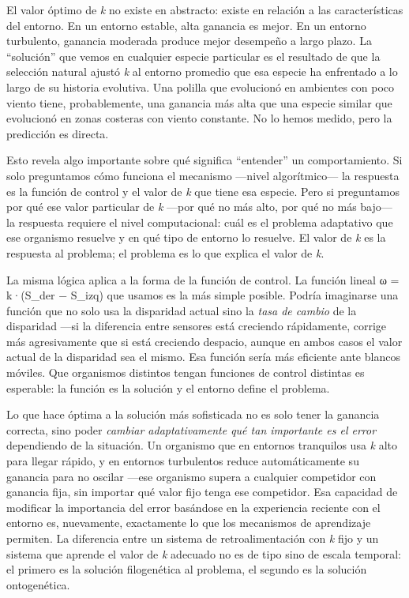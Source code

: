 \documentclass[
  letterpaper,
  DIV=11,
  numbers=noendperiod]{scrreprt}
\begin{document}
\begin{tcolorbox}[enhanced jigsaw, toprule=.15mm, arc=.35mm, colback=white, opacityback=0, colframe=quarto-callout-note-color-frame, breakable, rightrule=.15mm, left=2mm, leftrule=.75mm, bottomrule=.15mm]
El valor óptimo de \emph{k} no existe en abstracto: existe en relación a
las características del entorno. En un entorno estable, alta ganancia es
mejor. En un entorno turbulento, ganancia moderada produce mejor
desempeño a largo plazo. La ``solución'' que vemos en cualquier especie
particular es el resultado de que la selección natural ajustó \emph{k}
al entorno promedio que esa especie ha enfrentado a lo largo de su
historia evolutiva. Una polilla que evolucionó en ambientes con poco
viento tiene, probablemente, una ganancia más alta que una especie
similar que evolucionó en zonas costeras con viento constante. No lo
hemos medido, pero la predicción es directa.

Esto revela algo importante sobre qué significa ``entender'' un
comportamiento. Si solo preguntamos cómo funciona el mecanismo ---nivel
algorítmico--- la respuesta es la función de control y el valor de
\emph{k} que tiene esa especie. Pero si preguntamos por qué ese valor
particular de \emph{k} ---por qué no más alto, por qué no más bajo--- la
respuesta requiere el nivel computacional: cuál es el problema
adaptativo que ese organismo resuelve y en qué tipo de entorno lo
resuelve. El valor de \emph{k} es la respuesta al problema; el problema
es lo que explica el valor de \emph{k}.

La misma lógica aplica a la forma de la función de control. La función
lineal ω = k·(S\_der − S\_izq) que usamos es la más simple posible.
Podría imaginarse una función que no solo usa la disparidad actual sino
la \emph{tasa de cambio} de la disparidad ---si la diferencia entre
sensores está creciendo rápidamente, corrige más agresivamente que si
está creciendo despacio, aunque en ambos casos el valor actual de la
disparidad sea el mismo. Esa función sería más eficiente ante blancos
móviles. Que organismos distintos tengan funciones de control distintas
es esperable: la función es la solución y el entorno define el problema.

Lo que hace óptima a la solución más sofisticada no es solo tener la
ganancia correcta, sino poder \emph{cambiar adaptativamente qué tan
importante es el error} dependiendo de la situación. Un organismo que en
entornos tranquilos usa \emph{k} alto para llegar rápido, y en entornos
turbulentos reduce automáticamente su ganancia para no oscilar ---ese
organismo supera a cualquier competidor con ganancia fija, sin importar
qué valor fijo tenga ese competidor. Esa capacidad de modificar la
importancia del error basándose en la experiencia reciente con el
entorno es, nuevamente, exactamente lo que los mecanismos de aprendizaje
permiten. La diferencia entre un sistema de retroalimentación con
\emph{k} fijo y un sistema que aprende el valor de \emph{k} adecuado no
es de tipo sino de escala temporal: el primero es la solución
filogenética al problema, el segundo es la solución ontogenética.


\end{tcolorbox}
\end{document}
